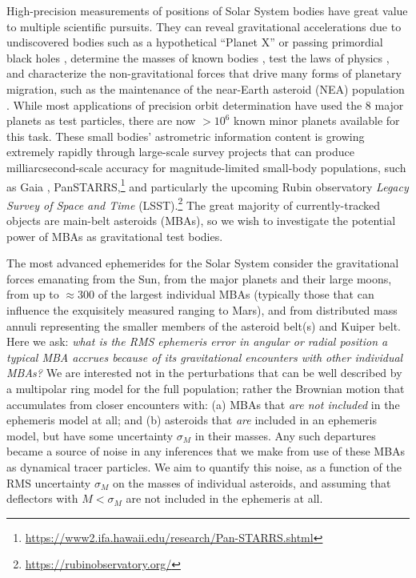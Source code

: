 \documentclass[linenumbers, onecolumn]{aastex631}
\newcommand{\eg}{\textit{e.g.\/}}
\begin{document}
High-precision measurements of positions of Solar System bodies have
great value to multiple scientific pursuits.  They can reveal
gravitational accelerations due to undiscovered bodies such as a
hypothetical ``Planet X'' \citep[\eg][]{holmanP9,inpopP9,trojans,occultations} or passing primordial
black holes \citep[\eg][]{pbh}, determine
the masses of known bodies \citep[\eg][]{goffin,baer}, test the laws
of physics \citep[\eg][]{inpopgraviton}, and characterize 
the non-gravitational forces that drive many forms of planetary
migration, such as the maintenance of the near-Earth asteroid (NEA)
population \citep[reviewed by][]{yarkovsky}.  While most applications of precision orbit determination
have used the 8 major planets as test particles, there are now $>10^6$
known minor planets available for this task.  These small bodies' astrometric
information content is growing extremely rapidly through large-scale
survey projects that can produce
milliarcsecond-scale accuracy for magnitude-limited small-body populations, such as Gaia \citep{gaiass3,gaiafpr},
PanSTARRS,\footnote{\url{https://www2.ifa.hawaii.edu/research/Pan-STARRS.shtml}}
and particularly the upcoming Rubin observatory
\textit{Legacy Survey of Space and Time} (LSST).\footnote{\url{https://rubinobservatory.org/}}  The great majority
of currently-tracked objects are main-belt asteroids (MBAs), so we
wish to investigate the potential power of MBAs as gravitational test
bodies.

The most advanced ephemerides for the Solar System \citep{de440,inpop,pitjeva} consider the
gravitational forces emanating from the Sun, from the major planets and their large
moons, from up to $\approx300$ of the largest individual MBAs (typically those that can influence the exquisitely measured ranging to Mars), and
from distributed mass annuli representing the smaller members of
 the asteroid belt(s) and Kuiper belt.
Here we ask: \textit{what is the RMS ephemeris error in angular or radial
position a typical MBA accrues because of its gravitational
encounters with other individual MBAs?}  We are interested not in the
perturbations that can be well described by a multipolar ring model
for the full population; rather the Brownian motion that accumulates
from closer encounters with: (a) MBAs that \emph{are not included} in the
ephemeris model at all; and (b) asteroids that \emph{are} included
in an ephemeris model, but have some uncertainty $\sigma_M$ in their masses.
Any such departures became a source of noise in any
inferences that we make from use of these MBAs as
dynamical tracer particles.  We aim to quantify this noise, as a
function of the RMS uncertainty $\sigma_M$ on the masses of individual
asteroids, and assuming that deflectors with $M<\sigma_M$ are not
included in the ephemeris at all.
\end{document}
